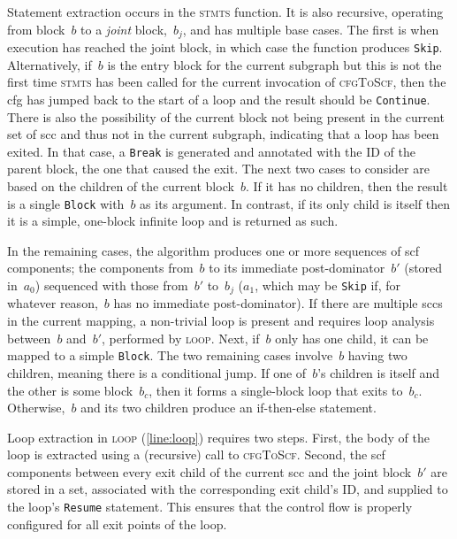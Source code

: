 Statement extraction occurs in the \textsc{stmts} function.
It is also recursive, operating from block~$b$ to a \emph{joint} block,~$b_j$,%
and has multiple base cases.
The first is when execution has reached the joint block,
in which case the function produces \texttt{Skip}.
Alternatively, if~$b$ is the entry block for the current subgraph
but this is not the first time \textsc{stmts} has been called
for the current invocation of \textsc{cfgToScf},
then the \ac{cfg} has jumped back to the start of a loop
and the result should be \texttt{Continue}.%
There is also the possibility of the current block
not being present in the current set of \ac{scc} and thus not in the current subgraph,
indicating that a loop has been exited.
In that case, a \texttt{Break} is generated%
and annotated with the ID of the parent block, the one that caused the exit.
The next two cases to consider are based on the children of the current block~$b$.
If it has no children, then the result is a single \texttt{Block}
with~$b$ as its argument.
In contrast, if its only child is itself then it is a simple, one-block infinite loop
and is returned as such.

In the remaining cases,
the algorithm produces one or more sequences of \ac{scf} components;
the components from~$b$ to its immediate post-dominator~$b'$ (stored in~$a_0$)%
sequenced with those from~$b'$ to~$b_j$ ($a_1$, which may be \texttt{Skip} if,
for whatever reason,~$b$ has no immediate post-dominator).
If there are multiple \acp{scc} in the current mapping,
a non-trivial loop is present and requires loop analysis between~$b$ and~$b'$,
performed by \textsc{loop}.
Next, if~$b$ only has one child, it can be mapped to a simple \texttt{Block}.
The two remaining cases involve~$b$ having two children,
meaning there is a conditional jump.
If one of~$b$'s children is itself and the other is some block~$b_c$,
then it forms a single-block loop that exits to~$b_c$.
Otherwise,~$b$ and its two children produce an if-then-else statement.

Loop extraction in \textsc{loop} (\cref{line:loop}) requires two steps.%
First, the body of the loop is extracted
using a (recursive) call to \textsc{cfgToScf}.
Second, the \ac{scf} components between every exit child of the current \ac{scc}
and the joint block~$b'$ are stored in a set, associated with the corresponding%
exit child's ID, and supplied to the loop's \texttt{Resume} statement.
This ensures that the control flow is properly configured
for all exit points of the loop.


